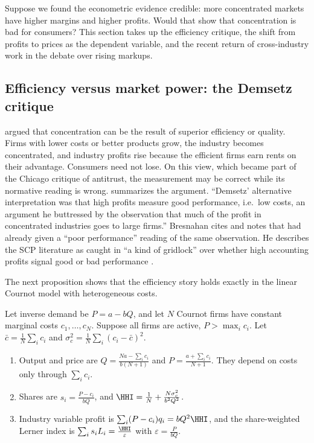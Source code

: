 Suppose we found the econometric evidence credible: more concentrated markets have higher margins and
higher profits. Would that show that concentration is bad for consumers? This section takes up the
efficiency critique, the shift from profits to prices as the dependent variable, and the recent return of
cross-industry work in the debate over rising markups.

\subsection{Efficiency versus market power: the Demsetz critique}\label{sec:01-demsetz}

\citet{Demsetz1973} argued that concentration can be the result of superior efficiency or quality. Firms
with lower costs or better products grow, the industry becomes concentrated, and industry profits rise
because the efficient firms earn rents on their advantage. Consumers need not lose. On this view, which
became part of the Chicago critique of antitrust, the measurement may be correct while its normative
reading is wrong. \citet[p.~1013, fn.~2]{Bresnahan1989} summarizes the argument. ``Demsetz' alternative
interpretation was that high profits measure good performance, i.e.\ low costs, an argument he buttressed
by the observation that much of the profit in concentrated industries goes to large firms.'' Bresnahan
cites \citet{Demsetz1974} and notes that \citet{Bain1951} had already given a ``poor performance''
reading of the same observation. He describes the SCP literature as caught in ``a kind of gridlock'' over
whether high accounting profits signal good or bad performance \citep[p.~1013]{Bresnahan1989}.

The next proposition shows that the efficiency story holds exactly in the linear Cournot model with
heterogeneous costs.

\begin{proposition}\label{prop:01-demsetz}
Let inverse demand be $P = a - bQ$, and let $N$ Cournot firms have constant marginal costs $c_1, \dots,
c_N$. Suppose all firms are active, $P > \max_i c_i$. Let $\bar c = \frac{1}{N}\sum_i c_i$ and
$\sigma_c^2 = \frac{1}{N}\sum_i (c_i - \bar c)^2$.
\begin{enumerate}[label=(\roman*)]
\item Output and price are $Q = \frac{Na - \sum_i c_i}{b(N + 1)}$ and $P = \frac{a + \sum_i c_i}{N + 1}$.
They depend on costs only through $\sum_i c_i$.
\item Shares are $s_i = \frac{P - c_i}{bQ}$, and $\HHI = \frac{1}{N} + \frac{N \sigma_c^2}{b^2 Q^2}$.
\item Industry variable profit is $\sum_i (P - c_i) q_i = bQ^2 \HHI$, and the share-weighted Lerner index
is $\sum_i s_i L_i = \frac{\HHI}{\varepsilon}$ with $\varepsilon = \frac{P}{bQ}$.
\end{enumerate}
\end{proposition}

